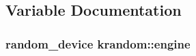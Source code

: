 \subsection{Variable Documentation}
\hypertarget{namespacekrandom_a5c40b80390a0425475af691519056f21}{
\subsubsection[{engine}]{\setlength{\rightskip}{0pt plus 5cm}random\-\_\-device {\bf krandom\-::engine}}}\label{namespacekrandom_a5c40b80390a0425475af691519056f21}

